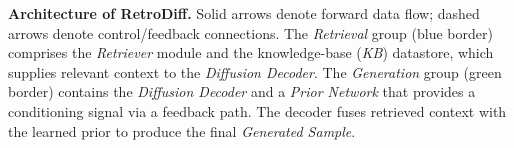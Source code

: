 \caption{\textbf{Architecture of RetroDiff.} Solid arrows denote forward data flow; dashed arrows denote control/feedback connections. The \textit{Retrieval} group (blue border) comprises the \textit{Retriever} module and the knowledge-base (\textit{KB}) datastore, which supplies relevant context to the \textit{Diffusion Decoder}. The \textit{Generation} group (green border) contains the \textit{Diffusion Decoder} and a \textit{Prior Network} that provides a conditioning signal via a feedback path. The decoder fuses retrieved context with the learned prior to produce the final \textit{Generated Sample}.}
